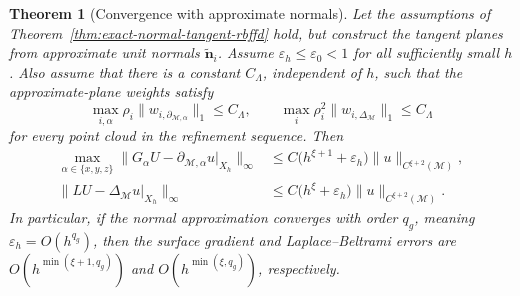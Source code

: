 \documentclass[10pt,a4paper]{amsart}
\newtheorem{theorem}{Theorem}
\begin{document}
\begin{theorem}[Convergence with approximate normals]
\label{thm:approximate-normal-tangent-rbffd}
Let the assumptions of Theorem~\ref{thm:exact-normal-tangent-rbffd} hold, but
construct the tangent planes from approximate unit normals
\(\widetilde{\bm n}_i\).  Assume \(\varepsilon_h\leq\varepsilon_0<1\) for all
sufficiently small \(h\).  Also assume that there is a constant
\(C_\Lambda\), independent of \(h\), such that the approximate-plane weights
satisfy
\begin{equation}
  \max_{i,\alpha}
  \rho_i\|w_{i,\partial_{\mathcal M,\alpha}}\|_1
  \leq C_\Lambda,
  \qquad
  \max_i
  \rho_i^2\|w_{i,\Delta_{\mathcal M}}\|_1
  \leq C_\Lambda
  \label{eq:theory-approximate-uniform-stability}
\end{equation}
for every point cloud in the refinement sequence.  Then
\begin{align}
  \max_{\alpha\in\{x,y,z\}}
  \|G_\alpha U-\partial_{\mathcal M,\alpha}u|_{X_h}\|_\infty
  &\leq C\bigl(h^{\xi+1}+\varepsilon_h\bigr)
  \|u\|_{C^{\xi+2}(\mathcal M)},
  \label{eq:approximate-normal-global-gradient}\\
  \|LU-\Delta_{\mathcal M}u|_{X_h}\|_\infty
  &\leq C\bigl(h^\xi+\varepsilon_h\bigr)
  \|u\|_{C^{\xi+2}(\mathcal M)}.
  \label{eq:approximate-normal-global-laplacian}
\end{align}
In particular, if the normal approximation converges with order \(q_g\),
meaning $\varepsilon_h=O(h^{q_g})$,
then the surface gradient and Laplace--Beltrami errors are $O\!\left(h^{\min(\xi+1,q_g)}\right)$ and $O\!\left(h^{\min(\xi,q_g)}\right)$,
respectively.
\end{theorem}
\end{document}
